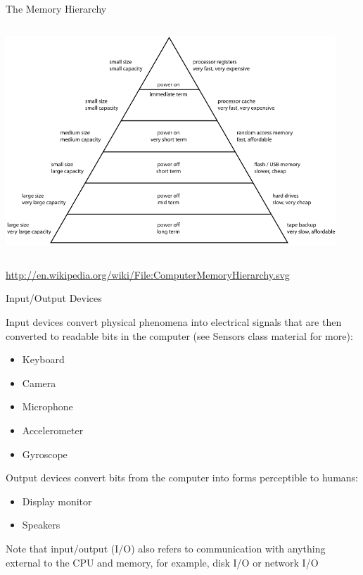 \documentclass{beamer}
\begin{document}
\begin{frame}{The Memory Hierarchy}

\vspace{-.15in}
\begin{columns}
\begin{column}{6in}
\includegraphics[height=3.1in]{memory-hierarchy.png}
\end{column}
\end{columns}
\scriptsize \url{http://en.wikipedia.org/wiki/File:ComputerMemoryHierarchy.svg} \normalsize
\end{frame}

\begin{frame}{Input/Output Devices}

Input devices convert physical phenomena into electrical signals that are
then converted to readable bits in the computer (see Sensors class
material for more):
\begin{itemize}
\item Keyboard
\item Camera
\item Microphone
\item Accelerometer
\item Gyroscope
\end{itemize}
Output devices convert bits from the computer into forms perceptible
to humans:
\begin{itemize}
\item Display monitor
\item Speakers
\end{itemize}
Note that input/output (I/O) also refers to communication with
anything external to the CPU and memory, for example, disk I/O or
network I/O
\end{frame}
\end{document}
